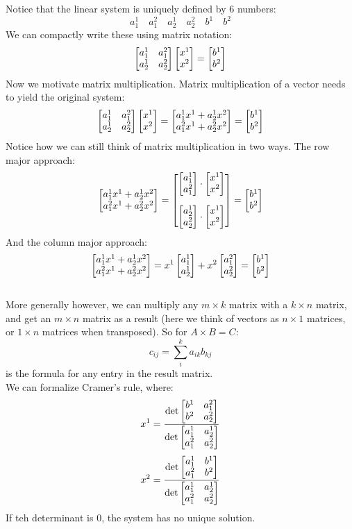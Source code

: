 \documentclass[12pt]{article}
\begin{document}
    Notice that the linear system is uniquely
    defined by 6 numbers:
    \[ a_1^1 \quad a_1^2 \quad a_2^1 \quad a_2^2
    \quad b^1 \quad b^2 \]
    We can compactly write these using matrix notation:
    \[ \begin{bmatrix} {a_1^1}&{a_1^2}\\{a_2^1}&{a_2^2} \end{bmatrix}
    \begin{bmatrix} {x^1} \\ {x^2} \end{bmatrix} = \begin{bmatrix} {b^1} \\ {b^2} \end{bmatrix} \]
    Now we motivate matrix multiplication.
    Matrix multiplication of a vector needs
    to yield the original system:
    \[ \begin{bmatrix} {a_1^1} & {a_1^2} \\ {a_2^1} & {a_2^2} \end{bmatrix}
    \begin{bmatrix} {x^1} \\{x^2} \end{bmatrix}
    = \begin{bmatrix} {a_1^1x^1 + a_2^1x^2} \\ {a_1^2x^1 + a_2^2x^2} \end{bmatrix}
    = \begin{bmatrix} {b^1} \\ {b^2} \end{bmatrix} \]
    Notice how we can still think of matrix multiplication
    in two ways.
    The row major approach:
    \[ \bmat{{a_1^1x^1 + a_2^1x^2} \\ {a_1^2x^1 + a_2^2x^2}}
    = \bmat{{\bmat{{a_1^1} \\ {a_1^2}} 
    \cdot \bmat{{x^1} \\ {x^2}}} \vs{10} \\
    {\bmat{{a_2^1} \\ {a_2^2}} \cdot \bmat{{x^1} \\ {x^2}}}}
    = \bmat{{b^1}\\ {b^2}} \]
    And the column major approach:
    \[ \begin{bmatrix} {a_1^1x^1 + a_2^1x^2} \\ {a_1^2x^1 + a_2^2x^2} \end{bmatrix}
    = x^1\begin{bmatrix} {a_1^1} \\ {a_2^1} \end{bmatrix} 
    + x^2\begin{bmatrix} {a_1^2} \\ {a_2^2} \end{bmatrix}
    = \begin{bmatrix} {b^1} \\ {b^2} \end{bmatrix} \]
    \\

    More generally however, we can multiply
    any $m \times k$ matrix with a $k \times n$
    matrix, and get an $m\times n$ matrix as a result
    (here we think of vectors as $n \times 1$ matrices,
    or $1 \times n$ matrices when transposed).
    So for $A \times B = C$:
    \[ c_{ij} = \sum_{i}^{k}a_{ik}b_{kj} \]
    is the formula for any entry in the result matrix. \\

    We can formalize Cramer's rule,
    where:
    \[ x^1 = \dfrac{
        \det{\begin{bmatrix} {b^1} & {a_1^2} \\ {b^2} & {a_2^2} \end{bmatrix}}
    }{\det{\begin{bmatrix} {a_1^1} & {a_2^1} \\ {a_1^2} & {a_2^2} \end{bmatrix}}} \]
    \[ x^2 = \dfrac{
        \det{\begin{bmatrix} {a_1^1} & {b^1} \\ {a_1^2} & {b^2} \end{bmatrix}}
    }{\det{\begin{bmatrix} {a_1^1} & {a_2^1} \\ {a_1^2} & {a_2^2} \end{bmatrix}}} \]
    If teh determinant is 0, 
    the system has no unique solution. \\
\end{document}
